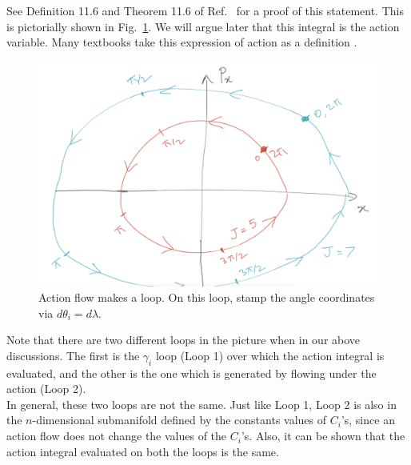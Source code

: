 See Definition 11.6 and Theorem 11.6 of
Ref.~\cite{fasano} for a proof of this statement.
This is pictorially shown in
Fig.~\ref{action_loop}. 
We will argue later that this integral
is the action variable.
Many textbooks take this expression of action as a definition \cite{goldstein2013classical}. \\






\begin{figure}
  \centering
  \includegraphics[width=0.7\linewidth]{action_loop}
  \caption{ Action flow makes a loop. On this loop,
  stamp the angle coordinates via $d \theta_i = d \lambda$.
    \vspace{-1.em}
  }
  \label{action_loop}
\end{figure}





\hfill \break


\begin{definition}[label=def:C2]


Note that there are two different loops in the picture when in our 
above discussions. The first is the $\gamma_i$ loop (Loop 1) over which
the action integral is evaluated, and the other is the one which is generated
by flowing under the action (Loop 2).\\


In general, these two loops are not the same.
Just like Loop 1,
Loop 2 is also in the $n$-dimensional submanifold
defined by the constants values of $C_i$'s, since
an action flow does not change the values of the $C_i$'s.
 Also, it can be shown that the action
integral evaluated on both the loops is the same.
 



\end{definition}

\hfill \break

